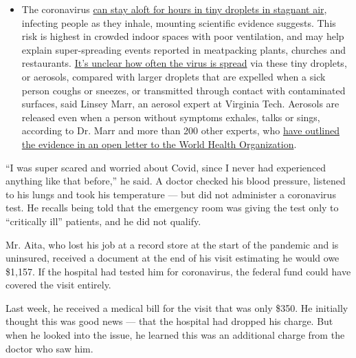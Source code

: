 \begin{itemize}
  \begin{itemize}
  \tightlist
  \item
    The coronavirus
    \href{https://www.nytimes3xbfgragh.onion/2020/07/04/health/239-experts-with-one-big-claim-the-coronavirus-is-airborne.html?action=click\&pgtype=Article\&state=default\&region=MAIN_CONTENT_3\&context=storylines_faq}{can
    stay aloft for hours in tiny droplets in stagnant air}, infecting
    people as they inhale, mounting scientific evidence suggests. This
    risk is highest in crowded indoor spaces with poor ventilation, and
    may help explain super-spreading events reported in meatpacking
    plants, churches and restaurants.
    \href{https://www.nytimes3xbfgragh.onion/2020/07/06/health/coronavirus-airborne-aerosols.html?action=click\&pgtype=Article\&state=default\&region=MAIN_CONTENT_3\&context=storylines_faq}{It's
    unclear how often the virus is spread} via these tiny droplets, or
    aerosols, compared with larger droplets that are expelled when a
    sick person coughs or sneezes, or transmitted through contact with
    contaminated surfaces, said Linsey Marr, an aerosol expert at
    Virginia Tech. Aerosols are released even when a person without
    symptoms exhales, talks or sings, according to Dr. Marr and more
    than 200 other experts, who
    \href{https://academic.oup.com/cid/article/doi/10.1093/cid/ciaa939/5867798}{have
    outlined the evidence in an open letter to the World Health
    Organization}.
  \end{itemize}
\end{itemize}

``I was super scared and worried about Covid, since I never had
experienced anything like that before,'' he said. A doctor checked his
blood pressure, listened to his lungs and took his temperature --- but
did not administer a coronavirus test. He recalls being told that the
emergency room was giving the test only to ``critically ill'' patients,
and he did not qualify.

Mr. Aita, who lost his job at a record store at the start of the
pandemic and is uninsured, received a document at the end of his visit
estimating he would owe \$1,157. If the hospital had tested him for
coronavirus, the federal fund could have covered the visit entirely.

Last week, he received a medical bill for the visit that was only \$350.
He initially thought this was good news --- that the hospital had
dropped his charge. But when he looked into the issue, he learned this
was an additional charge from the doctor who saw him.

